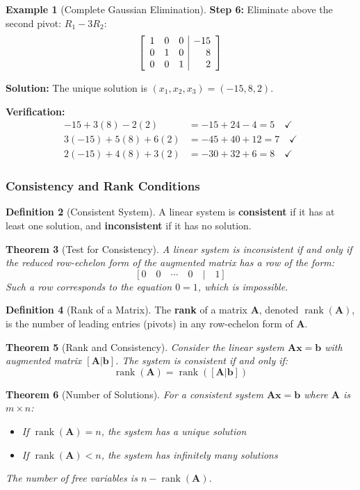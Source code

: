 \documentclass[12pt]{article}
\numberwithin{equation}{section}
\newcommand{\vect}[1]{\boldsymbol{#1}}   %
\newcommand{\mat}[1]{\mathbf{#1}}        %
\newcommand{\rank}{\operatorname{rank}}
\newenvironment{amatrix}[1]{%
  \left[\begin{array}{#1}}
  {\end{array}\right]}
\theoremstyle{plain}
\newtheorem{theorem}{Theorem}[section]
\theoremstyle{definition}
\newtheorem{definition}[theorem]{Definition}
\newtheorem{example}[theorem]{Example}
\theoremstyle{remark}
\begin{document}
\begin{example}[Complete Gaussian Elimination]
\textbf{Step 6:} Eliminate above the second pivot:
$R_1 - 3R_2$:
$$\begin{amatrix}{rrr|r}
1 & 0 & 0 & -15\\
0 & 1 & 0 & 8\\
0 & 0 & 1 & 2
\end{amatrix}$$

\textbf{Solution:} The unique solution is $(x_1, x_2, x_3) = (-15, 8, 2)$.

\textbf{Verification:}
\begin{align}
-15 + 3(8) - 2(2) &= -15 + 24 - 4 = 5 \quad \checkmark\\
3(-15) + 5(8) + 6(2) &= -45 + 40 + 12 = 7 \quad \checkmark\\
2(-15) + 4(8) + 3(2) &= -30 + 32 + 6 = 8 \quad \checkmark
\end{align}
\end{example}

\subsubsection{Consistency and Rank Conditions}

\begin{definition}[Consistent System]
A linear system is \textbf{consistent} if it has at least one solution, and \textbf{inconsistent} if it has no solution.
\end{definition}

\begin{theorem}[Test for Consistency]
A linear system is inconsistent if and only if the reduced row-echelon form of the augmented matrix has a row of the form:
$$[0 \quad 0 \quad \cdots \quad 0 \quad | \quad 1]$$
Such a row corresponds to the equation $0 = 1$, which is impossible.
\end{theorem}

\begin{definition}[Rank of a Matrix]
The \textbf{rank} of a matrix $\mat{A}$, denoted $\rank(\mat{A})$, is the number of leading entries (pivots) in any row-echelon form of $\mat{A}$.
\end{definition}

\begin{theorem}[Rank and Consistency]
Consider the linear system $\mat{A}\vect{x} = \vect{b}$ with augmented matrix $[\mat{A}|\vect{b}]$. The system is consistent if and only if:
$$\rank(\mat{A}) = \rank([\mat{A}|\vect{b}])$$
\end{theorem}

\begin{theorem}[Number of Solutions]
For a consistent system $\mat{A}\vect{x} = \vect{b}$ where $\mat{A}$ is $m \times n$:
\begin{itemize}
\item If $\rank(\mat{A}) = n$, the system has a unique solution
\item If $\rank(\mat{A}) < n$, the system has infinitely many solutions
\end{itemize}
The number of free variables is $n - \rank(\mat{A})$.
\end{theorem}
\end{document}
